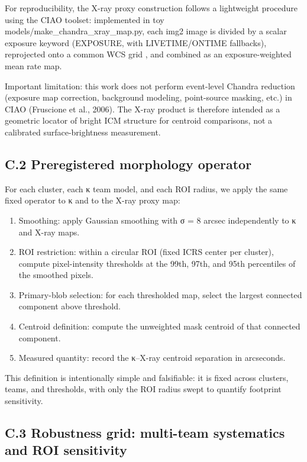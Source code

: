 \documentclass[11pt]{article}
\begin{document}
For reproducibility, the X-ray proxy construction follows a lightweight procedure using the \citep{Fruscione2006} CIAO toolset: implemented in toy models/make\_chandra\_xray\_map.py, each img2 image is divided by a scalar exposure keyword (EXPOSURE, with LIVETIME/ONTIME fallbacks), reprojected onto a common WCS grid \citep{MAST2019}, and combined as an exposure-weighted mean rate map.

Important limitation: this work does not perform event-level Chandra reduction (exposure map correction, background modeling, point-source masking, etc.) in CIAO (Fruscione et al., 2006). The X-ray product is therefore intended as a geometric locator of bright ICM structure for centroid comparisons, not a calibrated surface-brightness measurement.

\subsection{C.2 Preregistered morphology operator}\label{c.2-preregistered-morphology-operator}

For each cluster, each κ team model, and each ROI radius, we apply the same fixed operator to κ and to the X-ray proxy map:

\begin{enumerate}
\def\labelenumi{\arabic{enumi})}
\item
  Smoothing: apply Gaussian smoothing with σ = 8 arcsec independently to κ and X-ray maps.
\item
  ROI restriction: within a circular ROI (fixed ICRS center per cluster), compute pixel-intensity thresholds at the 99th, 97th, and 95th percentiles of the smoothed pixels.
\item
  Primary-blob selection: for each thresholded map, select the largest connected component above threshold.
\item
  Centroid definition: compute the unweighted mask centroid of that connected component.
\item
  Measured quantity: record the κ--X-ray centroid separation in arcseconds.
\end{enumerate}

\citep{MAST2019, Weisskopf2002, Fruscione2006} This definition is intentionally simple and falsifiable: it is fixed across clusters, teams, and thresholds, with only the ROI radius swept to quantify footprint sensitivity.

\subsection{C.3 Robustness grid: multi-team systematics and ROI sensitivity}\label{c.3-robustness-grid-multi-team-systematics-and-roi-sensitivity}
\end{document}
